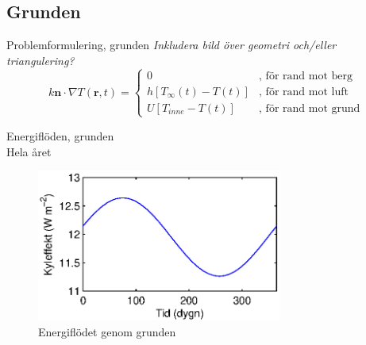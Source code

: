 \subsection{Grunden}

\begin{frame}{Problemformulering, grunden}
\emph{\color{red} Inkludera bild över geometri och/eller triangulering?}
\begin{equation*}
k\mathbf{n}\cdot\nabla T(\mathbf{r},t) = 
\begin{cases}
0&\mbox{, för rand mot berg} \\
h[T_\infty(t)-T(t)]&\mbox{, för rand mot luft} \\
U[T_{inne} - T(t)]&\mbox{, för rand mot grund}
\end{cases}
\end{equation*}
\end{frame}

\begin{frame}{Energiflöden, grunden\\Hela året}

\begin{figure}[hpbt]
\centering
\includegraphics[height=5cm]{images/foundation.eps}
\caption*{Energiflödet genom grunden}
\end{figure}

\end{frame}
